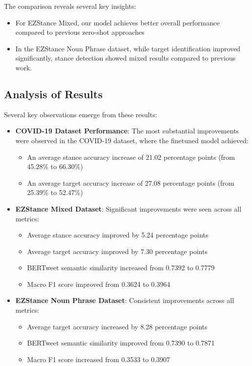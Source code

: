 \documentclass[twocolumn,11pt,letterpaper]{article}
\begin{document}
The comparison reveals several key insights:
\begin{itemize}
    \item For EZStance Mixed, our model achieves better overall performance compared to previous zero-shot approaches
    \item In the EZStance Noun Phrase dataset, while target identification improved significantly, stance detection showed mixed results compared to previous work.
\end{itemize}

\subsection{Analysis of Results}
Several key observations emerge from these results:

\begin{itemize}
    \item \textbf{COVID-19 Dataset Performance}: The most substantial improvements were observed in the COVID-19 dataset, where the finetuned model achieved:
    \begin{itemize}
        \item An average stance accuracy increase of 21.02 percentage points (from 45.28\% to 66.30\%)
        \item An average target accuracy increase of 27.08 percentage points (from 25.39\% to 52.47\%)
    \end{itemize}
    
    \item \textbf{EZStance Mixed Dataset}: Significant improvements were seen across all metrics:
    \begin{itemize}
        \item Average stance accuracy improved by 5.24 percentage points
        \item Average target accuracy improved by 7.30 percentage points
        \item BERTweet semantic similarity increased from 0.7392 to 0.7779
        \item Macro F1 score improved from 0.3624 to 0.3964
    \end{itemize}
    
    \item \textbf{EZStance Noun Phrase Dataset}: Consistent improvements across all metrics:
    \begin{itemize}
        \item Average target accuracy increased by 8.28 percentage points
        \item BERTweet semantic similarity improved from 0.7390 to 0.7871
        \item Macro F1 score increased from 0.3533 to 0.3907
    \end{itemize}
    

\end{itemize}
\end{document}
